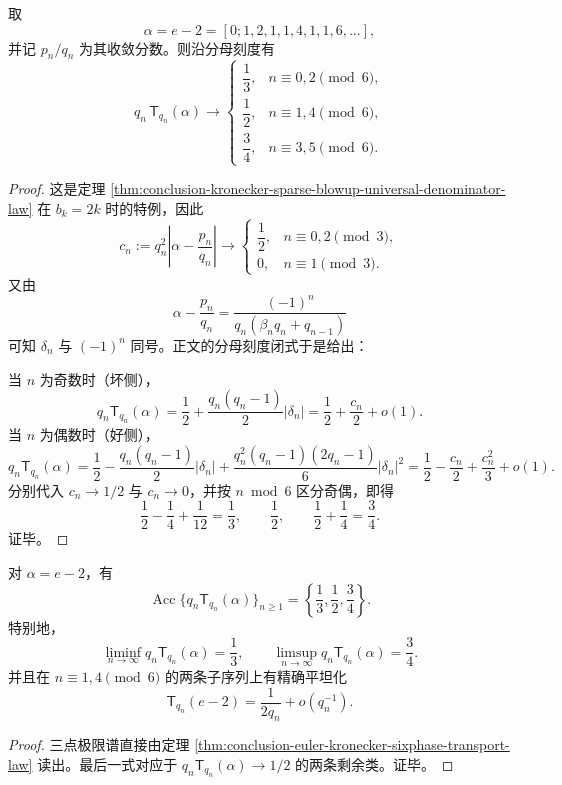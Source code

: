 \begin{theorem}\label{thm:conclusion-euler-kronecker-sixphase-transport-law}
取
\[
\alpha=e-2=[0;1,2,1,1,4,1,1,6,\ldots],
\]
并记 \(p_n/q_n\) 为其收敛分数。则沿分母刻度有
\[
q_n\,\mathsf T_{q_n}(\alpha)\longrightarrow
\begin{cases}
\dfrac13,& n\equiv 0,2 \pmod 6,\\[4pt]
\dfrac12,& n\equiv 1,4 \pmod 6,\\[4pt]
\dfrac34,& n\equiv 3,5 \pmod 6.
\end{cases}
\]
\end{theorem}
\begin{proof}
这是定理 \ref{thm:conclusion-kronecker-sparse-blowup-universal-denominator-law} 在 \(b_k=2k\) 时的特例，因此
\[
c_n:=q_n^2\left|\alpha-\frac{p_n}{q_n}\right|
\longrightarrow
\begin{cases}
\dfrac12,& n\equiv 0,2 \pmod 3,\\[4pt]
0,& n\equiv 1 \pmod 3.
\end{cases}
\]
又由
\[
\alpha-\frac{p_n}{q_n}
=
\frac{(-1)^n}{q_n(\beta_n q_n+q_{n-1})}
\]
可知 \(\delta_n\) 与 \((-1)^n\) 同号。正文的分母刻度闭式于是给出：

当 \(n\) 为奇数时（坏侧），
\[
q_n\mathsf T_{q_n}(\alpha)
=
\frac12+\frac{q_n(q_n-1)}{2}\left|\delta_n\right|
=
\frac12+\frac{c_n}{2}+o(1).
\]
当 \(n\) 为偶数时（好侧），
\[
q_n\mathsf T_{q_n}(\alpha)
=
\frac12-\frac{q_n(q_n-1)}{2}\left|\delta_n\right|
+\frac{q_n^2(q_n-1)(2q_n-1)}{6}\left|\delta_n\right|^2
=
\frac12-\frac{c_n}{2}+\frac{c_n^2}{3}+o(1).
\]
分别代入 \(c_n\to 1/2\) 与 \(c_n\to0\)，并按 \(n\bmod 6\) 区分奇偶，即得
\[
\frac12-\frac14+\frac1{12}=\frac13,\qquad
\frac12,\qquad
\frac12+\frac14=\frac34.
\]
证毕。
\end{proof}

\begin{corollary}\label{cor:conclusion-euler-kronecker-threepoint-transport-spectrum}
对 \(\alpha=e-2\)，有
\[
\operatorname{Acc}\bigl\{q_n\mathsf T_{q_n}(\alpha)\bigr\}_{n\ge1}
=
\left\{\frac13,\frac12,\frac34\right\}.
\]
特别地，
\[
\liminf_{n\to\infty}q_n\mathsf T_{q_n}(\alpha)=\frac13,
\qquad
\limsup_{n\to\infty}q_n\mathsf T_{q_n}(\alpha)=\frac34.
\]
并且在 \(n\equiv1,4\pmod6\) 的两条子序列上有精确平坦化
\[
\mathsf T_{q_n}(e-2)=\frac1{2q_n}+o(q_n^{-1}).
\]
\end{corollary}
\begin{proof}
三点极限谱直接由定理 \ref{thm:conclusion-euler-kronecker-sixphase-transport-law} 读出。最后一式对应于 \(q_n\mathsf T_{q_n}(\alpha)\to 1/2\) 的两条剩余类。证毕。
\end{proof}

